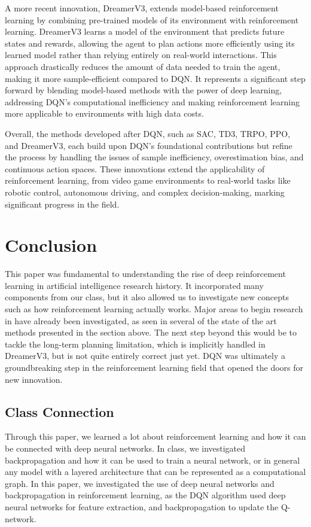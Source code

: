 \documentclass{article}
\begin{document}
A more recent innovation, DreamerV3, \cite{dreamerv3} extends model-based reinforcement learning by combining pre-trained models of its environment with reinforcement learning. DreamerV3 learns a model of the environment that predicts future states and rewards, allowing the agent to plan actions more efficiently using its learned model rather than relying entirely on real-world interactions. This approach drastically reduces the amount of data needed to train the agent, making it more sample-efficient compared to DQN. It represents a significant step forward by blending model-based methods with the power of deep learning, addressing DQN’s computational inefficiency and making reinforcement learning more applicable to environments with high data costs.

Overall, the methods developed after DQN, such as SAC, TD3, TRPO, PPO, and DreamerV3, each build upon DQN’s foundational contributions but refine the process by handling the issues of sample inefficiency, overestimation bias, and continuous action spaces. These innovations extend the applicability of reinforcement learning, from video game environments to real-world tasks like robotic control, autonomous driving, and complex  decision-making, marking significant progress in the field.

\section{Conclusion}
This paper was fundamental to understanding the rise of deep reinforcement learning in artificial intelligence research history. It incorporated many components from our class, but it also allowed us to investigate new concepts such as how reinforcement learning actually works. Major areas to begin research in have already been investigated, as seen in several of the state of the art methods presented in the section above. The next step beyond this would be to tackle the long-term planning limitation, which is implicitly handled in DreamerV3, but is not quite entirely correct just yet. DQN was ultimately a groundbreaking step in the reinforcement learning field that opened the doors for new innovation. 

\subsection{Class Connection}
Through this paper, we learned a lot about reinforcement learning and how it can be connected with deep neural networks. In class, we investigated backpropagation and how it can be used to train a neural network, or in general any model with a layered architecture that can be represented as a computational graph. In this paper, we investigated the use of deep neural networks and backpropagation in reinforcement learning, as the DQN algorithm used deep neural networks for feature extraction, and backpropagation to update the Q-network. 
\end{document}

